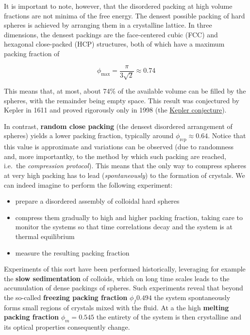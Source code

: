 \documentclass[
  letterpaper,
  enabledeprecatedfontcommands]{report}
\providecommand{\tightlist}{%
  \setlength{\itemsep}{0pt}\setlength{\parskip}{0pt}}
\begin{document}
It is important to note, however, that the disordered packing at high
volume fractions are not minima of the free energy. The densest possible
packing of hard spheres is achieved by arranging them in a crystalline
lattice. In three dimensions, the densest packings are the face-centered
cubic (FCC) and hexagonal close-packed (HCP) structures, both of which
have a maximum packing fraction of

\[
\phi_{\text{max}} = \frac{\pi}{3\sqrt{2}} \approx 0.74
\]

This means that, at most, about 74\% of the available volume can be
filled by the spheres, with the remainder being empty space. This result
was conjectured by Kepler in 1611 and proved rigorously only in 1998
(the \href{https://en.wikipedia.org/wiki/Kepler_conjecture}{Kepler
conjecture}).

In contrast, \textbf{random close packing} (the densest disordered
arrangement of spheres) yields a lower packing fraction, typically
around \(\phi_{\text{rcp}} \approx 0.64\). Notice that this value is
approximate and variations can be observed (due to randomness and, more
importantky, to the method by which such packing are reached, i.e.~the
\emph{compression protocol}). This means that the only way to compress
spheres at very high packing has to lead (\emph{spontaneously}) to the
formation of crystals. We can indeed imagine to perform the following
experiment:

\begin{itemize}
\tightlist
\item
  prepare a disordered assembly of colloidal hard spheres
\item
  compress them gradually to high and higher packing fraction, taking
  care to monitor the systems so that time correlations decay and the
  system is at thermal equilibrium
\item
  measure the resulting packing fraction
\end{itemize}

Experiments of this sort have been performed historically, leveraging
for example the \textbf{slow sedimentation} of colloids, which on long
time scales leads to the accumulation of dense packings of spheres. Such
experiments reveal that beyond the so-called \textbf{freezing packing
fraction} \(\phi_{f} 0.494\) the system spontaneously forms small
regions of crystals mixed with the fluid. At a the high \textbf{melting
packing fraction} \(\phi_{m}=0.545\) the entirety of the system is then
crystalline and its optical properties consequently change.
\end{document}
